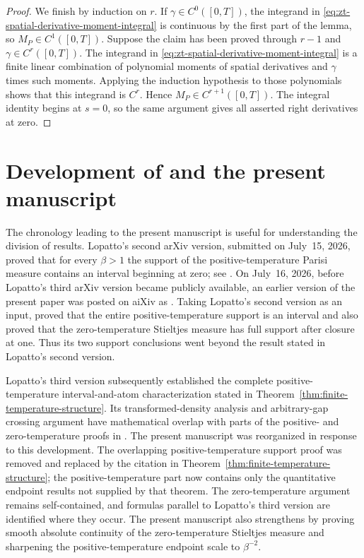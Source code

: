 \documentclass[10pt]{amsart}
\theoremstyle{definition}
\theoremstyle{remark}
\numberwithin{equation}{section}
\newcommand{\1}{\mathbf 1}
\begin{document}
\begin{proof}
We finish by induction on $r$.  If $\gamma\in C^0([0,T])$, the integrand in \eqref{eq:zt-spatial-derivative-moment-integral} is continuous by the first part of the lemma, so $M_P\in C^1([0,T])$.  Suppose the claim has been proved through $r-1$ and $\gamma\in C^r([0,T])$.  The integrand in \eqref{eq:zt-spatial-derivative-moment-integral} is a finite linear combination of polynomial moments of spatial derivatives and $\gamma$ times such moments.  Applying the induction hypothesis to those polynomials shows that this integrand is $C^r$.  Hence $M_P\in C^{r+1}([0,T])$.  The integral identity begins at $s=0$, so the same argument gives all asserted right derivatives at zero.
\end{proof}
\fi

\section{\texorpdfstring{Development of \cite{AIxivPreprint} and the present manuscript}{Development of the aiXiv preprint and the present manuscript}}
\label{app:development}
The chronology leading to the present manuscript is useful for understanding the division of results. Lopatto's second arXiv version, submitted on July~15, 2026, proved that for every $\beta>1$ the support of the positive-temperature Parisi measure contains an interval beginning at zero; see \cite[Theorem~1.1]{Lopatto2026v2}. On July~16, 2026, before Lopatto's third arXiv version became publicly available, an earlier version of the present paper was posted on aiXiv as \cite{AIxivPreprint}. Taking Lopatto's second version as an input, \cite{AIxivPreprint} proved that the entire positive-temperature support is an interval and also proved that the zero-temperature Stieltjes measure has full support after closure at one. Thus its two support conclusions went beyond the result stated in Lopatto's second version.

Lopatto's third version subsequently established the complete positive-temperature interval-and-atom characterization stated in Theorem~\ref{thm:finite-temperature-structure}. Its transformed-density analysis and arbitrary-gap crossing argument have mathematical overlap with parts of the positive- and zero-temperature proofs in \cite{AIxivPreprint}. The present manuscript was reorganized in response to this development. The overlapping positive-temperature support proof was removed and replaced by the citation in Theorem~\ref{thm:finite-temperature-structure}; the positive-temperature part now contains only the quantitative endpoint results not supplied by that theorem. The zero-temperature argument remains self-contained, and formulas parallel to Lopatto's third version are identified where they occur. The present manuscript also strengthens \cite{AIxivPreprint} by proving smooth absolute continuity of the zero-temperature Stieltjes measure and sharpening the positive-temperature endpoint scale to $\beta^{-2}$.
\end{document}
